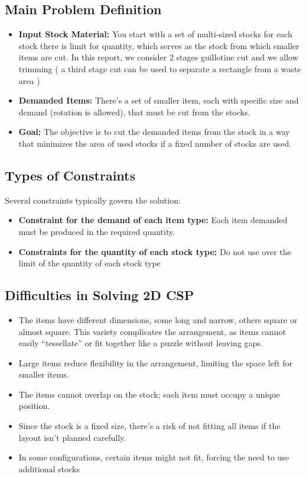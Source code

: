 \documentclass[a4paper]{article}
\begin{document}
\subsection{Main Problem Definition}
\begin{itemize}
    \item \textbf{Input Stock Material:} You start with a set of multi-sized stocks for each stock there is limit for quantity, which serves as the stock from which smaller items are cut. In this report, we consider 2 stages guillotine cut and we allow trimming ( a third stage cut can be used to separate a rectangle from a waste area ) 
    \item \textbf{Demanded Items:} There’s a set of smaller item, each with specific size and demand (rotation is allowed), that must be cut from the stocks.
    \item \textbf{Goal: }The objective is to cut the demanded items from the stock in a way that minimizes the area of used stocks if a fixed number of stocks are used.
\end{itemize}



\subsection{Types of Constraints}
Several constraints typically govern the solution:
    \begin{itemize}
    
    \item \textbf{Constraint for the demand of each item type:} Each item demanded must be produced in the required quantity.

    
    \item \textbf{Constraints for the quantity of each stock type:} Do not use over the limit of the quantity of each stock type 
\end{itemize}

\subsection{Difficulties in Solving 2D CSP}
\begin{itemize}
        \item The items have different dimensions, some long and narrow, others square or almost square. This variety complicates the arrangement, as items cannot easily “tessellate” or fit together like a puzzle without leaving gaps.
        \item Large items reduce flexibility in the arrangement, limiting the space left for smaller items.
        \item The items cannot overlap on the stock; each item must occupy a unique position.
        \item Since the stock is a fixed size, there's a risk of not fitting all items if the layout isn’t planned carefully.
        \item In some configurations, certain items might not fit, forcing the need to use additional stocks
\end{itemize}
\end{document}
